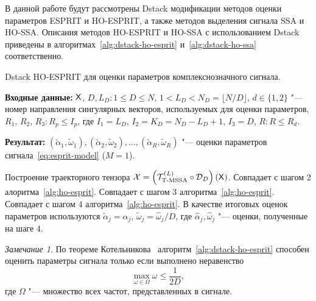 \documentclass[specialist,
  substylefile=spbu_report.rtx,
subf,href,colorlinks=true, 12pt]{disser}
\theoremstyle{plain}
\theoremstyle{definition}
\theoremstyle{remark}
\newtheorem{remark}{Замечание}[section]
\newcommand{\Input}{\textbf{Входные данные: }}
\newcommand{\Output}{\textbf{Результат: }}
\begin{document}
В данной работе будут рассмотрены Dstack модификации методов оценки
параметров ESPRIT и HO-ESPRIT, а также методов выделения сигнала SSA и HO-SSA.
Описания методов HO-ESPRIT и HO-SSA с использованием Dstack приведены
в алгоритмах~\ref{alg:dstack-ho-esprit} и~\ref{alg:dstack-ho-ssa}
соответственно.
\begin{algorithm}[!ht]
  \caption{Dstack HO-ESPRIT для оценки параметров комплекснозначного сигнала.}
  \label{alg:dstack-ho-esprit}
  \Input $\mathsf{X}$, $D, L_D: 1\leqslant D \leqslant N,\, 1 < L_D < N_D = \lfloor N /
  D \rfloor$,
  $d\in \{1, 2\}$ "--- номер направления сингулярных векторов,
  используемых для оценки параметров,
  $R_1$, $R_2$, $R_3: R_p \leqslant I_p$, где
  $I_1=L_D$, $I_2=K_D=N_D - L_D + 1$, $I_3=D$,
  $R: R\leqslant R_d$.

  \Output $\left(\widetilde{\alpha}_1, \widetilde{\omega}_1\right),
  \left(\widetilde{\alpha}_2, \widetilde{\omega}_2\right), \ldots,
  \left(\widetilde{\alpha}_R, \widetilde{\omega}_R\right)$ "---
  оценки параметров
  сигнала~\eqref{eq:esprit-model} ($M=1$).
  \begin{algorithmic}[1]
    \State Построение траекторного тензора $\mathcal{X} =
    \left(\mathcal{T}_{\textrm{T-MSSA}}^{(L)} \circ \mathcal{D}_D\right) (\mathsf{X})$.
    \State Совпадает с шагом 2 алоритма~\ref{alg:ho-esprit}.
    \State Совпадает с шагом 3 алгоритма~\ref{alg:ho-esprit}.
    \State Совпадает с шагом 4 алгоритма~\ref{alg:ho-esprit}.
    \State В качестве итоговых оценок параметров используются
    $\widetilde{\alpha}_j = \widehat{\alpha}_j$,
    $\widetilde{\omega}_j = \widehat{\omega}_j / D$,
    где $\widehat{\alpha}_j, \widehat{\omega}_j$ "--- оценки,
    полученные на шаге 4.
  \end{algorithmic}
\end{algorithm}
\begin{remark}
  По теореме Котельникова~\cite{Kotelnikov2006ru}
  алгоритм~\ref{alg:dstack-ho-esprit}
  способен оценить параметры сигнала только если
  выполнено неравенство
  \[
    \max_{\omega \in \Omega}\omega \leqslant \frac{1}{2D},
  \]
  где $\Omega$ "--- множество всех частот, представленных в сигнале.
\end{remark}
\end{document}
